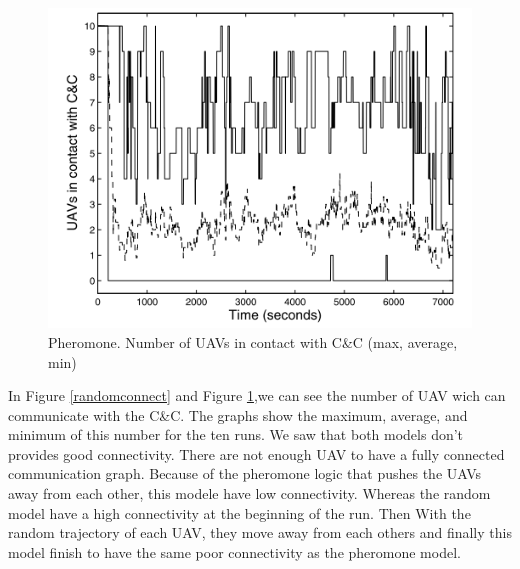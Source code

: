 \begin{figure}[h]
\caption{\label{pheromoneconnect}Pheromone. Number of UAVs in contact with C\&C (max, average, min)}
   \includegraphics{../images/pheromone_resultat_connectivite.png}
\end{figure}
In Figure \ref{randomconnect} and Figure \ref{pheromoneconnect},we can see the number of UAV wich can communicate with the C\&C.  The  graphs  show the maximum, average, and minimum of this number for the ten runs.
We saw that both models don't provides good connectivity. There are not enough UAV to have a fully connected communication graph. Because of the pheromone logic that pushes the UAVs away from each other, this modele have low connectivity. Whereas the random model have a high connectivity at the beginning of the run. Then With the random trajectory of each UAV, they move away from each others and finally this model finish to have the same poor connectivity as the pheromone model.

